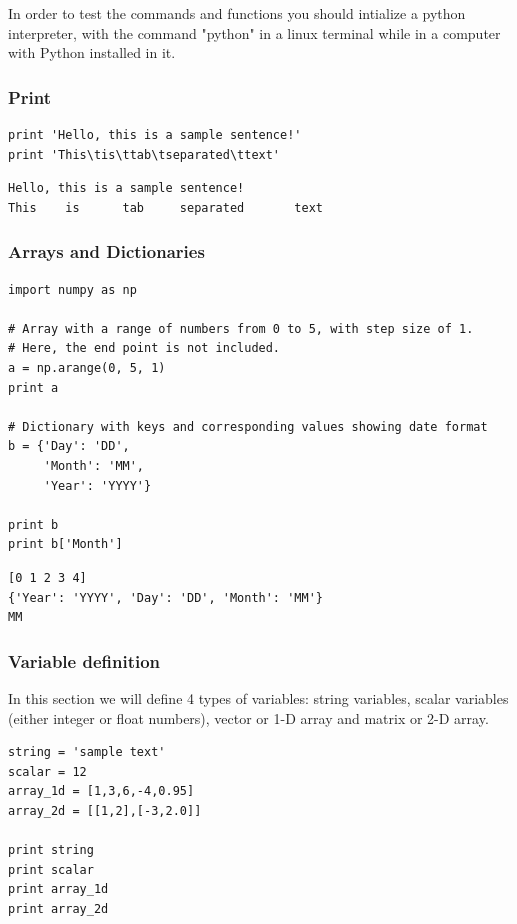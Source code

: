 \documentclass[11pt]{article}
\begin{document}
In order to test the commands and functions you should intialize a python interpreter, with the command "python" in a linux terminal while in a computer with Python installed in it.
\subsubsection{Print}
\label{sec-4-2-1}
\begin{verbatim}
print 'Hello, this is a sample sentence!'
print 'This\tis\ttab\tseparated\ttext'
\end{verbatim}

\begin{verbatim}
Hello, this is a sample sentence!
This    is      tab     separated       text
\end{verbatim}

\subsubsection{Arrays and Dictionaries}
\label{sec-4-2-2}
\begin{verbatim}
import numpy as np

# Array with a range of numbers from 0 to 5, with step size of 1.
# Here, the end point is not included.
a = np.arange(0, 5, 1)
print a

# Dictionary with keys and corresponding values showing date format
b = {'Day': 'DD',
     'Month': 'MM',
     'Year': 'YYYY'}

print b
print b['Month']
\end{verbatim}

\begin{verbatim}
[0 1 2 3 4]
{'Year': 'YYYY', 'Day': 'DD', 'Month': 'MM'}
MM
\end{verbatim}

\subsubsection{Variable definition}
\label{sec-4-2-3}
In this section we will define 4 types of variables: string variables, scalar variables (either integer or float numbers), vector or 1-D array and matrix or 2-D array.
\begin{verbatim}
string = 'sample text'
scalar = 12
array_1d = [1,3,6,-4,0.95]
array_2d = [[1,2],[-3,2.0]]

print string 
print scalar
print array_1d
print array_2d
\end{verbatim}
\end{document}
